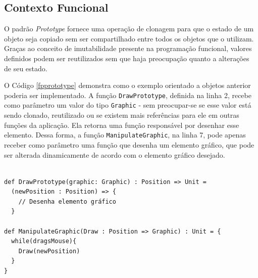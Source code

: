 \subsection*{Contexto Funcional}

O padrão \textit{Prototype} fornece uma operação de 
clonagem para que o estado de um objeto seja 
copiado sem ser compartilhado entre todos 
os objetos que o utilizam. Graças ao conceito 
de imutabilidade presente na programação 
funcional, valores definidos podem 
ser reutilizados sem que haja preocupação 
quanto a alterações de seu estado.

O Código \ref{fpprototype} demonstra como o 
exemplo orientado a objetos anterior poderia 
ser implementado. A função \texttt{DrawPrototype}, 
definida na linha 2, recebe como parâmetro um 
valor do tipo \texttt{Graphic} - sem preocupar-se se 
esse valor está sendo clonado, reutilizado ou 
se existem mais referências para ele em outras 
funções da aplicação. Ela retorna uma função 
responsável por desenhar esse elemento. Dessa 
forma, a função \texttt{ManipulateGraphic}, na linha 
7, pode apenas receber como parâmetro uma função 
que desenha um elemento gráfico, que pode ser 
alterada dinamicamente de acordo com o elemento 
gráfico desejado.

\begin{lstlisting}[caption={\textit{Prototype} Funcional.},label=fpprototype]
    
def DrawPrototype(graphic: Graphic) : Position => Unit =
  (newPosition : Position) => {
    // Desenha elemento gráfico
  }

def ManipulateGraphic(Draw : Position => Graphic) : Unit = {
  while(dragsMouse){
    Draw(newPosition)
  }
}
    
\end{lstlisting}
